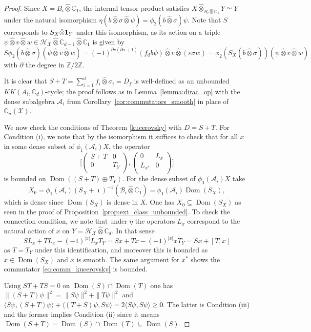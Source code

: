 \documentclass[12pt]{amsart}
\newcommand{\CM}{{\mathbb C}}
\newcommand{\ZM}{{\mathbb Z}}
\newcommand{\Aa}{{\mathcal A}}
\newcommand{\Bb}{{\mathcal B}}
\newcommand{\Hh}{{\mathcal H}}
\newcommand{\Xx}{{\mathcal X}}
\newcommand{\one}{{\bf 1}}
\newcommand{\ep}{\varepsilon}
\newcommand{\pdv}{\partial}
\DeclareMathOperator*{\Dom}{Dom}
\begin{document}
\begin{proof}

Since $X=B_i\hat{\otimes}\CM_1$, the internal tensor product satisfies $X \hat{\otimes}_{B_i\hat{\otimes}\CM_1} Y\simeq Y$ under the natural isomorphism $\eta(b\hat{\otimes}\sigma\hat{\otimes}\psi)= \phi_2(b\hat{\otimes}\sigma)\psi$. Note that $S$ corresponds to $S_X\hat{\otimes} \one_Y$ under this isomorphism, as its action on a triple $\psi \hat{\otimes} v \hat{\otimes} w \in \Hh_\Xx \hat{\otimes} \CM_{d-1} \hat{\otimes} \CM_1$ is given by
$$
S \phi_2(b \hat{\otimes} \sigma)(\psi \hat{\otimes} v \hat{\otimes} w) =(-1)^{\pdv v (\pdv \sigma+1)} ({f_d}b \psi) \hat{\otimes} v \hat{\otimes} (\ep \sigma w)=\phi_2(S_X(b\hat{\otimes}\sigma))(\psi \hat{\otimes} v \hat{\otimes} w)$$
with $\pdv$ the degree in $\ZM/2\ZM$. 

It is clear that $S+T=\sum_{i=1}^d f_i \hat{\otimes}\sigma_i=D_f$ is well-defined as an unbounded $KK(A_i,\CM_d)$-cycle; the proof follows as in Lemma~\ref{lemma:dirac_op} with the dense subalgebra $\Aa_i$ from Corollary~\ref{cor:commutators_smooth} in place of $\CM_u(\Xx)$. 

We now check the conditions of Theorem \ref{kucerovsky} with $D=S+T$.
For Condition (i), we note that by the isomorphism it suffices to check that
for all $x$ in some dense subset of $\phi_1(\mathcal{A}_i)X$, the operator
    \begin{equation}
    \label{eq:comm_kucerovsky} 
        \bigg[
        \begin{pmatrix}
        S + T & 0 \\
        0 & T_Y \\
        \end{pmatrix},
        \begin{pmatrix}
        0 & L_x \\
        L_{x^*} & 0 \\
        \end{pmatrix}
        \bigg]
    \end{equation}
    is bounded on $\Dom((S+T) \oplus T_Y)$.
    For the dense subset of $\phi_1(\Aa_i)X$ take 
    \[X_0 = \phi_1(\Aa_i)(S_X+\imath)^{-1} (\Bb_i\hat{\otimes}\CM_1)=\phi_1(\Aa_i)\Dom(S_X),\]
    which is dense since $\Dom(S_X)$ is dense in $X$. One has $X_0 \subseteq \Dom(S_X)$ as seen in the proof of Proposition~\ref{prop:ext_class_unbounded}.
    To check the connection condition, we note that under $\eta$ the operators $L_x$ correspond to the natural action of $x$ on $Y=\Hh_\Xx\hat{\otimes}\CM_{d}$. In that sense
    $$SL_x + TL_x - (-1)^{|x|}L_x T_Y = Sx + Tx - (-1)^{|x|}x T_Y= Sx+ [T, x]$$ as $T=T_Y$ under this identification, and moreover this is bounded as $x \in \Dom(S_X)$ and $x$ is smooth. The same argument for $x^*$ shows the commutator \eqref{eq:comm_kucerovsky} is bounded.
    
Using $ST+TS=0$ on $\Dom(S) \cap \Dom(T)$ one has $\|(S+T)\psi\|^2=\|S\psi\|^2+\|T\psi\|^2$ and $\langle S \psi, (S+T)\psi \rangle + \langle (T+S)\psi,  S \psi \rangle = 2\langle S \psi, S\psi\rangle\geq 0$. The latter is Condition (iii) and the former implies Condition (ii) since it means $\Dom(S+T)=\Dom(S)\cap\Dom(T)
\subseteq\Dom(S)$. 

\end{proof}
\end{document}
